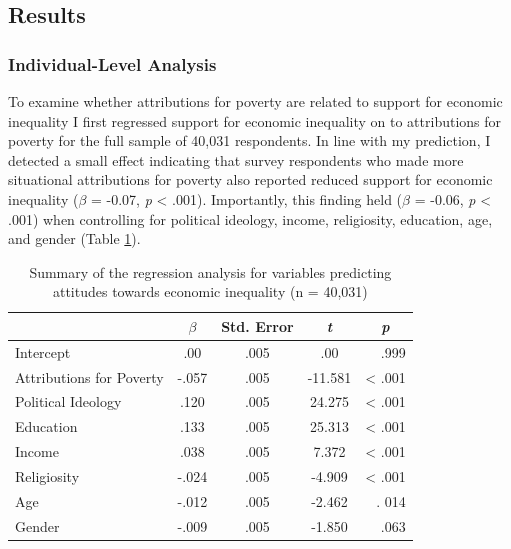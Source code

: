 \documentclass{sfuthesis}
\begin{document}
\subsection{Results}
\subsubsection{Individual-Level Analysis}

To examine whether attributions for poverty are related to support for economic inequality I first regressed support for economic inequality on to attributions for poverty for the full sample of 40,031 respondents.  In line with my prediction, I detected a small effect indicating that survey respondents who made more situational attributions for poverty also reported reduced support for economic inequality ($\beta$ = -0.07, \textit{p} < .001). Importantly, this finding held ($\beta$ = -0.06, \textit{p} < .001) when controlling for political ideology, income, religiosity, education, age, and gender (Table \ref{tab:firsttable}). 

\begin{table}[h]
  \begin{center}
    \caption{Summary of the regression analysis for variables predicting attitudes towards economic inequality (n = 40,031)}
    \label{tab:firsttable}
    \begin{tabular}{l c c c r}%
    \hline
       & $\beta$ & Std. Error & \textit{t} & \multicolumn{1}{c}{\textit{p}}\\
       \hline
       Intercept & \multicolumn{1}{S}{.00} & .005 & \multicolumn{1}{S}{.00} & .999\\
       Attributions for Poverty & \multicolumn{1}{S}{-.057} & .005 & \multicolumn{1}{S}{-11.581} & < .001\\
       Political Ideology & \multicolumn{1}{S}{.120} & .005 & \multicolumn{1}{S}{24.275} & < .001\\
       Education & \multicolumn{1}{S}{.133} & .005 & \multicolumn{1}{S}{25.313} & < .001\\
       Income & \multicolumn{1}{S}{.038} & .005 & \multicolumn{1}{S}{7.372} & < .001\\
       Religiosity & \multicolumn{1}{S}{-.024} & .005 & \multicolumn{1}{S}{-4.909} & < .001\\
       Age & \multicolumn{1}{S}{-.012} & .005 & \multicolumn{1}{S}{-2.462} & . 014\\
       Gender & \multicolumn{1}{S}{-.009} & .005 & \multicolumn{1}{S}{-1.850} & .063\\
       \hline
    \end{tabular}
  \end{center}
\end{table}
\end{document}
